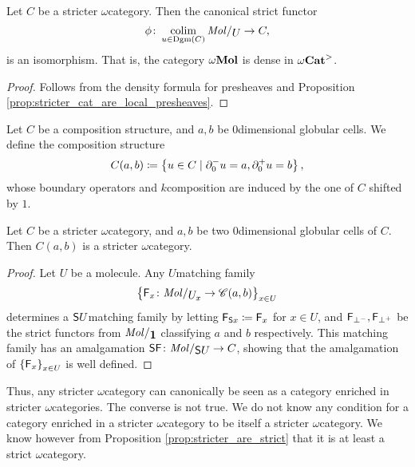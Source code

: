 \begin{cor} \label{cor:diagrams_are_dense} 
    Let \( C \) be a stricter \( \omega \)\nbd category.
    Then the canonical strict functor
    \begin{equation*}
        \phi \colon \colim_{u \in \Dgm(C)} \molecin{U} \to C,
    \end{equation*}
    is an isomorphism.
    That is, the category \( \omega\mathbf{Mol} \) is dense in \( {\omega\mathbf{Cat}}^> \).
\end{cor}
\begin{proof}
    Follows from the density formula for presheaves and Proposition \ref{prop:stricter_cat_are_local_presheaves}.
\end{proof}

\begin{dfn} 
    Let \( C \) be a composition structure, and \( a, b \) be \( 0 \)\nbd dimensional globular cells.
    We define the composition structure
    \begin{equation*}
        C(a, b) \coloneqq \left\{ {u \in C \mid \partial_{0}^{-} u = a, \partial_{0}^{+} u = b} \right\},    
    \end{equation*}
    whose boundary operators and \( k \)\nbd composition are induced by the one of \( C \) shifted by \( 1 \).
\end{dfn}

\begin{lem} \label{lem:hom_of_stricter_is_stricter}
    Let \( C \) be a stricter \( \omega \)\nbd category, and \( a, b \) be two \( 0 \)\nbd dimensional globular cells of \( C \).
    Then \( C(a, b) \) is a stricter \( \omega \)\nbd category.
\end{lem}
\begin{proof}
    Let \( U \) be a molecule.
    Any \( U \)\nbd matching family 
    \begin{equation*}
        \set{\F_x \colon \molecin{\imel{U}{x}} \to \C(a, b)}_{x \in U}
    \end{equation*}
    determines a \( \mathsf{S}{U} \)\nbd matching family 
    by letting \( \mathsf{F}_{\mathsf{S}{x}} \coloneqq \mathsf{F}_x \) for \( x \in U \), and \( \mathsf{F}_{\bot^-}, \mathsf{F}_{\bot^+} \) be the strict functors from \( \molecin{\pt} \) classifying \( a \) and \( b \) respectively. 
    This matching family has an amalgamation \( \sus{\F} \colon \molecin{\sus{U}} \to C \), showing that the amalgamation of \( \left\{ {\mathsf{F}_x} \right\}_{x \in U} \) is well defined.
\end{proof}

\begin{comm}
    Thus, any stricter \( \omega \)\nbd category can canonically be seen as a category enriched in stricter \( \omega \)\nbd categories.
    The converse is not true. 
    We do not know any condition for a category enriched in a stricter \( \omega \)\nbd category to be itself a stricter \( \omega \)\nbd category.
    We know however from Proposition \ref{prop:stricter_are_strict} that it is at least a strict \( \omega \)\nbd category.
\end{comm}


